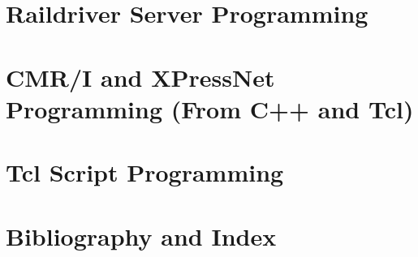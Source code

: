 \documentclass[12pt,notitlepage,twoside]{book}
\begin{document}
\lstset{language=Tcl,basicstyle=\footnotesize,numbers=left,stepnumber=5}%
\newcommand{\MRRSubTitle}{Programming Guides}

\tableofcontents
\lstlistoflistings
\listoffigures
\listoftables
\cleardoublepage
%       
\cleardoublepage
{}
%

\part{Raildriver Server Programming}

\part{CMR/I and XPressNet Programming (From C++ and Tcl)}


\part{Tcl Script Programming}











%
\part{Bibliography and Index}
\cleardoublepage
{}


\cleardoublepage
{}
\printindex
\end{document}
